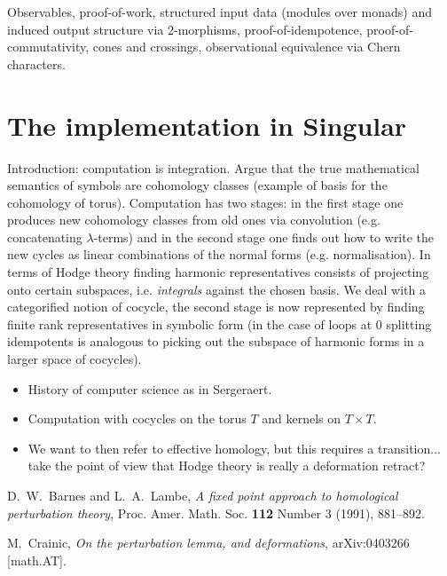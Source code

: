 \documentclass[english,letter paper,12pt,leqno]{article}
\theoremstyle{example}
\numberwithin{equation}{section}
\begin{document}
Observables, proof-of-work, structured input data (modules over monads) and induced output structure via $2$-morphisms, proof-of-idempotence, proof-of-commutativity, cones and crossings, observational equivalence via Chern characters.

\section{The implementation in Singular}

Introduction: computation is integration. Argue that the true mathematical semantics of symbols are cohomology classes (example of basis for the cohomology of torus). Computation has two stages: in the first stage one produces new cohomology classes from old ones via convolution (e.g. concatenating $\lambda$-terms) and in the second stage one finds out how to write the new cycles as linear combinations of the normal forms (e.g. normalisation). In terms of Hodge theory finding harmonic representatives consists of projecting onto certain subspaces, i.e. \emph{integrals} against the chosen basis. We deal with a categorified notion of cocycle, the second stage is now represented by finding finite rank representatives in symbolic form (in the case of loops at $0$ splitting idempotents is analogous to picking out the subspace of harmonic forms in a larger space of cocycles).

\begin{itemize}
\item History of computer science as in Sergeraert.
\item Computation with cocycles on the torus $T$ and kernels on $T \times T$.
\item We want to then refer to effective homology, but this requires a transition... take the point of view that Hodge theory is really a deformation retract?
\end{itemize}


\providecommand{\bysame}{\leavevmode\hbox to3em{\hrulefill}\thinspace}
\providecommand{\href}[2]{#2}
\begin{thebibliography}{BHLS03}

D.~W.~Barnes and L.~A.~Lambe, \emph{A fixed point approach to homological perturbation theory}, Proc. Amer.
  Math. Soc. \textbf{112} Number 3 (1991), 881--892.
  
M.~Crainic, \emph{On the perturbation lemma, and deformations}, arXiv:0403266
  [math.AT].

\end{thebibliography}
\end{document}
